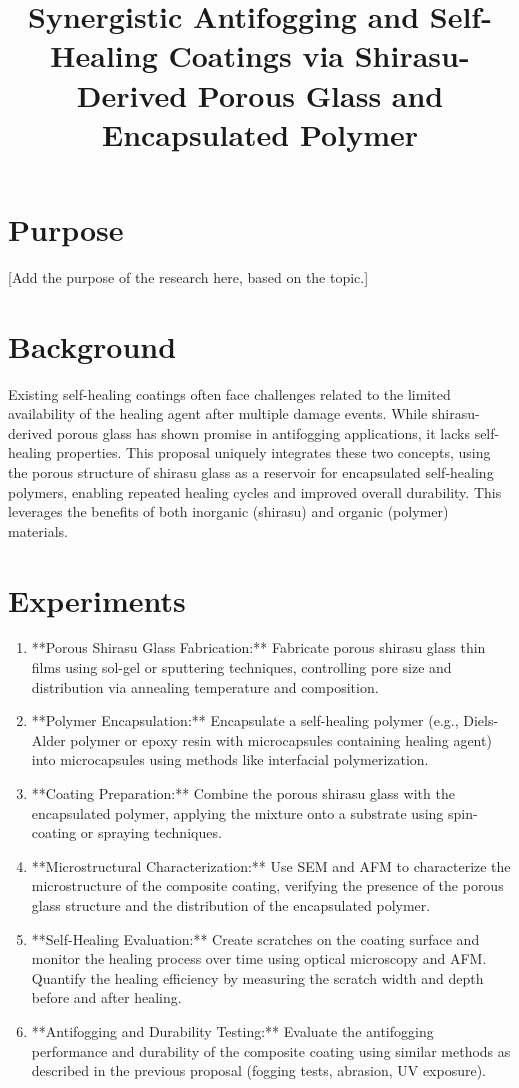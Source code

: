 \documentclass{article}
\title{Synergistic Antifogging and Self-Healing Coatings via Shirasu-Derived Porous Glass and Encapsulated Polymer}
\author{}
\date{}
\begin{document}
\maketitle
\section{Purpose}
[Add the purpose of the research here, based on the topic.]

\section{Background}
Existing self-healing coatings often face challenges related to the limited availability of the healing agent after multiple damage events. While shirasu-derived porous glass has shown promise in antifogging applications, it lacks self-healing properties. This proposal uniquely integrates these two concepts, using the porous structure of shirasu glass as a reservoir for encapsulated self-healing polymers, enabling repeated healing cycles and improved overall durability. This leverages the benefits of both inorganic (shirasu) and organic (polymer) materials.

\section{Experiments}
\begin{enumerate}
\item **Porous Shirasu Glass Fabrication:** Fabricate porous shirasu glass thin films using sol-gel or sputtering techniques, controlling pore size and distribution via annealing temperature and composition.
\item **Polymer Encapsulation:** Encapsulate a self-healing polymer (e.g., Diels-Alder polymer or epoxy resin with microcapsules containing healing agent) into microcapsules using methods like interfacial polymerization.
\item **Coating Preparation:** Combine the porous shirasu glass with the encapsulated polymer, applying the mixture onto a substrate using spin-coating or spraying techniques.
\item **Microstructural Characterization:** Use SEM and AFM to characterize the microstructure of the composite coating, verifying the presence of the porous glass structure and the distribution of the encapsulated polymer.
\item **Self-Healing Evaluation:** Create scratches on the coating surface and monitor the healing process over time using optical microscopy and AFM. Quantify the healing efficiency by measuring the scratch width and depth before and after healing.
\item **Antifogging and Durability Testing:** Evaluate the antifogging performance and durability of the composite coating using similar methods as described in the previous proposal (fogging tests, abrasion, UV exposure).
\end{enumerate}
\end{document}
